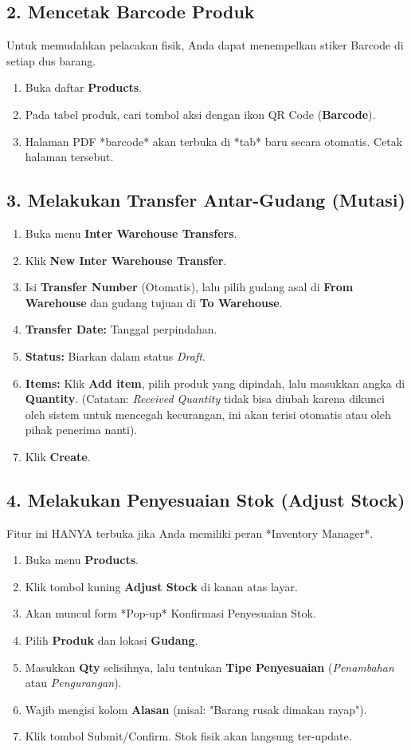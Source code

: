 \subsection{2. Mencetak Barcode Produk}
Untuk memudahkan pelacakan fisik, Anda dapat menempelkan stiker Barcode di setiap dus barang.
\begin{enumerate}
    \item Buka daftar \textbf{Products}.
    \item Pada tabel produk, cari tombol aksi dengan ikon QR Code (\textbf{Barcode}).
    \item Halaman PDF *barcode* akan terbuka di *tab* baru secara otomatis. Cetak halaman tersebut.
\end{enumerate}

\subsection{3. Melakukan Transfer Antar-Gudang (Mutasi)}
\begin{enumerate}
    \item Buka menu \textbf{Inter Warehouse Transfers}.
    \item Klik \textbf{New Inter Warehouse Transfer}.
    \item Isi \textbf{Transfer Number} (Otomatis), lalu pilih gudang asal di \textbf{From Warehouse} dan gudang tujuan di \textbf{To Warehouse}.
    \item \textbf{Transfer Date:} Tanggal perpindahan.
    \item \textbf{Status:} Biarkan dalam status \textit{Draft}.
    \item \textbf{Items:} Klik \textbf{Add item}, pilih produk yang dipindah, lalu masukkan angka di \textbf{Quantity}. (Catatan: \textit{Received Quantity} tidak bisa diubah karena dikunci oleh sistem untuk mencegah kecurangan, ini akan terisi otomatis atau oleh pihak penerima nanti).
    \item Klik \textbf{Create}.
\end{enumerate}

\subsection{4. Melakukan Penyesuaian Stok (Adjust Stock)}
Fitur ini HANYA terbuka jika Anda memiliki peran *Inventory Manager*.
\begin{enumerate}
    \item Buka menu \textbf{Products}.
    \item Klik tombol kuning \textbf{Adjust Stock} di kanan atas layar.
    \item Akan muncul form *Pop-up* Konfirmasi Penyesuaian Stok.
    \item Pilih \textbf{Produk} dan lokasi \textbf{Gudang}.
    \item Masukkan \textbf{Qty} selisihnya, lalu tentukan \textbf{Tipe Penyesuaian} (\textit{Penambahan} atau \textit{Pengurangan}).
    \item Wajib mengisi kolom \textbf{Alasan} (misal: "Barang rusak dimakan rayap").
    \item Klik tombol Submit/Confirm. Stok fisik akan langsung ter-update.
\end{enumerate}

